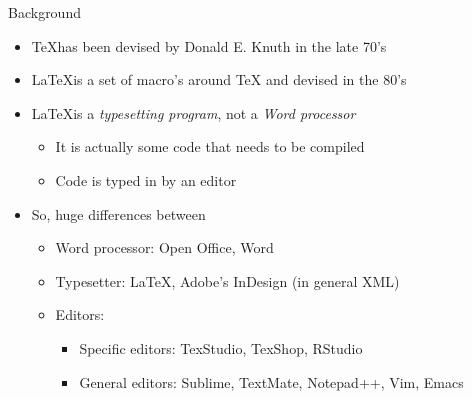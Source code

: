 \documentclass[ignorenonframetext,]{beamer}
\begin{document}
\begin{frame}{Background}

\begin{itemize}
\item
  \TeX has been devised by Donald E. Knuth in the late 70's
\item
  \LaTeX is a set of macro's around TeX and devised in the 80's
\item
  \LaTeX is a \emph{typesetting program}, not a \emph{Word processor}

  \begin{itemize}
  \itemsep1pt\parskip0pt
  \item
    It is actually some code that needs to be compiled
  \item
    Code is typed in by an editor
  \end{itemize}
\item
  So, huge differences between

  \begin{itemize}
  \item
    Word processor: Open Office, Word
  \item
    Typesetter: \LaTeX, Adobe's InDesign (in general XML)
  \item
    Editors:

    \begin{itemize}
    \itemsep1pt\parskip0pt
    \item
      Specific editors: TexStudio, TexShop, RStudio
    \item
      General editors: Sublime, TextMate, Notepad++, Vim, Emacs
    \end{itemize}
  \end{itemize}
\end{itemize}

\end{frame}
\end{document}
